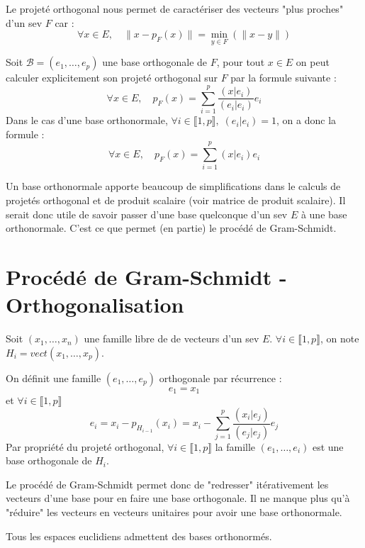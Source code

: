 \begin{proposition}
    Le projeté orthogonal nous permet de caractériser des vecteurs "plus proches" d'un sev $F$ car :
        \[ \forall x \in E, \quad \| x - p_F(x) \| = \min_{y \in F}(\|x - y\|) \] 
\end{proposition}

\begin{proposition}
    Soit $\mathcal{B} = (e_1, \dots, e_p)$ une base orthogonale de $F$, pour tout $x \in E$ on peut 
    calculer explicitement son projeté orthogonal sur $F$ par la formule suivante :
        \[ \forall x \in E, \quad p_F(x) = \sum_{i=1}^{p} \frac{(x|e_i)}{(e_i|e_i)} e_i \] 
    Dans le cas d'une base orthonormale, $ \forall i \in \llbracket 1, p \rrbracket, \; (e_i|e_i) = 1 $, on a donc la formule :
        \[ \forall x \in E, \quad p_F(x) = \sum_{i=1}^{p} {(x|e_i)} e_i \] 
\end{proposition}

Un base orthonormale apporte beaucoup de simplifications dans le calculs de projetés orthogonal et de produit scalaire 
(voir matrice de produit scalaire). Il serait donc utile de savoir passer d'une base quelconque d'un sev $E$ à une base orthonormale. 
C'est ce que permet (en partie) le procédé de Gram-Schmidt. 



\section{Procédé de Gram-Schmidt - Orthogonalisation}

\begin{theorem}
    Soit $(x_1, \dots, x_n)$ une famille libre de de vecteurs d'un sev $E$. 
    $ \forall i \in \llbracket 1, p \rrbracket$, on note $H_i = vect(x_1, \dots, x_p)$. 

    On définit une famille $(e_1, \dots, e_p)$ orthogonale par récurrence :
        \[ e_1 = x_1 \] 
    et $\forall i \in \llbracket 1, p \rrbracket$ 
        \[ e_i  = x_i - p_{H_{i-1}}(x_i) = x_i - \sum_{j=1}^{p} \frac{(x_i|e_j)}{(e_j|e_j)} e_j \]
    Par propriété du projeté orthogonal, $\forall i \in \llbracket 1, p \rrbracket $ la famille $(e_1, \dots, e_i)$ 
    est une base orthogonale de $H_{i}$. 
\end{theorem}

Le procédé de Gram-Schmidt permet donc de "redresser" itérativement les vecteurs d'une base pour en faire une base 
orthogonale. Il ne manque plus qu'à "réduire" les vecteurs en vecteurs unitaires pour avoir une base orthonormale. 

\begin{corollary}
    Tous les espaces euclidiens admettent des bases orthonormés. 
\end{corollary}





